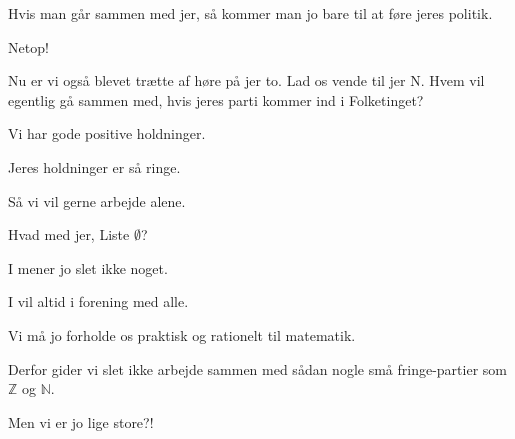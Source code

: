 \documentclass[a4paper,11pt]{article}
\begin{document}
\begin{sketch}
 Hvis man går sammen med jer, så kommer man jo bare til at føre jeres politik.

 Netop!

 Nu er vi også blevet trætte af høre på jer to. Lad os vende til jer N.
Hvem vil egentlig gå sammen med, hvis jeres parti kommer ind i Folketinget?

 Vi har gode positive holdninger.

 Jeres holdninger er så ringe.

 Så vi vil gerne arbejde alene.

 Hvad med jer, Liste \ensuremath{\emptyset}?

 I mener jo slet ikke noget.

 I vil altid i forening med alle.

 Vi må jo forholde os praktisk og rationelt til matematik.

 Derfor gider vi slet ikke arbejde sammen med sådan nogle små fringe-partier som \ensuremath{\mathbb{Z}} og \ensuremath{\mathbb{N}}.

 Men vi er jo lige store?!

\end{sketch}
\end{document}
